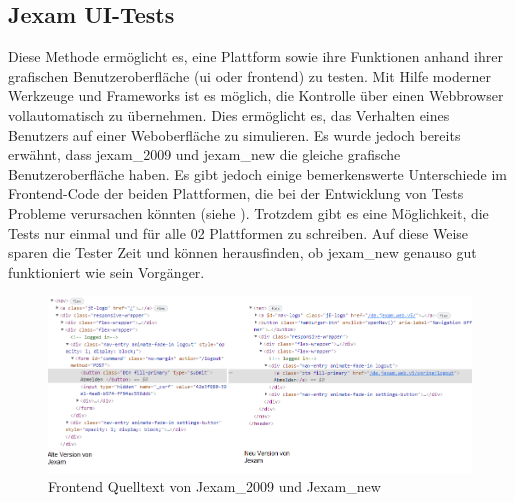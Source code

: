 \subsection{Jexam UI-Tests}

Diese Methode erm\"oglicht es, eine Plattform sowie ihre Funktionen anhand
ihrer grafischen Benutzeroberfl\"ache (\acs{ui} oder \Gls{frontend}) zu
testen. Mit Hilfe moderner Werkzeuge und Frameworks ist es m\"oglich, die
Kontrolle \"uber einen Webbrowser vollautomatisch zu \"ubernehmen. Dies
erm\"oglicht es, das Verhalten eines Benutzers auf einer Weboberfl\"ache zu
simulieren. Es wurde jedoch bereits erw\"ahnt, dass \Gls{jexam_2009} und \Gls{jexam_new}
die gleiche grafische Benutzeroberfl\"ache haben. Es gibt jedoch einige
bemerkenswerte Unterschiede im Frontend-Code der beiden Plattformen,
die bei der Entwicklung von Tests Probleme verursachen k\"onnten
(siehe ). Trotzdem gibt es eine
M\"oglichkeit, die Tests nur einmal und f\"ur alle 02
Plattformen zu schreiben. Auf diese Weise sparen die Tester Zeit und k\"onnen
herausfinden, ob \Gls{jexam_new} genauso gut funktioniert wie sein Vorg\"anger.

\noindent
\begin{figure}
    \centering
    \includegraphics[scale=0.6]{images/jexam_compare}
    \caption{Frontend Quelltext von Jexam\_2009 und Jexam\_new} \label{fig:old_new}
\end{figure}

